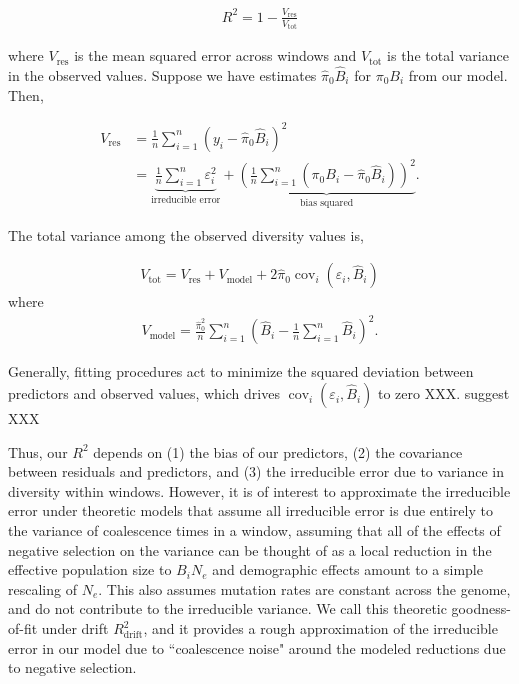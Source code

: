 \documentclass[11pt]{article}
\DeclareMathOperator{\cov}{cov}
\begin{document}
\begin{align}
    R^2 = 1 - \frac{V_\text{res}}{V_\text{tot}}
\end{align}

where $V_\text{res}$ is the mean squared error across windows and
$V_\text{tot}$ is the total variance in the observed values. Suppose we have
estimates $\widehat{\pi}_0 \widehat{B}_i$ for $\pi_0 B_i$ from our model. Then,

\begin{align}
    V_\text{res} &= \frac{1}{n} \sum_{i=1}^n (y_i - \widehat{\pi}_0 \widehat{B}_i)^2  \\
                 &= \underbrace{\frac{1}{n} \sum_{i=1}^n \varepsilon_i^2}_\text{irreducible error} + \underbrace{\left(\frac{1}{n} \sum_{i=1}^n (\pi_0 B_i - \widehat{\pi}_0 \widehat{B}_i)\right)^2}_\text{bias squared}.
\end{align}

The total variance among the observed diversity values is,

\begin{align}
    V_\text{tot} = V_\text{res} + V_\text{model} + 2\widehat{\pi}_0\cov_i(\varepsilon_i, \widehat{B}_i)
\end{align}
where 
\begin{align}
    V_\text{model} = \frac{\widehat{\pi}_0^2}{n} \sum_{i=1}^n \left(\widehat{B}_i - \frac{1}{n}\sum_{i=1}^n\widehat{B}_i\right)^2.
\end{align}

Generally, fitting procedures act to minimize the squared deviation between
predictors and observed values, which drives $\cov_i(\varepsilon_i,
\widehat{B}_i)$ to zero XXX. \textcite{Murphy2022-sj} suggest  XXX 

Thus, our $R^2$ depends on (1) the bias of our predictors, (2) the covariance
between residuals and predictors, and (3) the irreducible error due to variance
in diversity within windows. However, it is of interest to approximate the
irreducible error under theoretic models that assume all irreducible error is
due entirely to the variance of coalescence times in a window, assuming that
all of the effects of negative selection on the variance can be thought of as a
local reduction in the effective population size to $B_i N_e$ and demographic
effects amount to a simple rescaling of $N_e$. This also assumes mutation rates
are constant across the genome, and do not contribute to the irreducible
variance. We call this theoretic goodness-of-fit under drift
$R_\text{drift}^2$, and it provides a rough approximation of the irreducible
error in our model due to ``coalescence noise" around the modeled reductions
due to negative selection.
\end{document}
